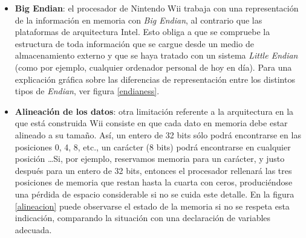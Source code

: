 \begin{itemize}
\item \textbf{Big Endian}: el procesador de Nintendo Wii trabaja con una representación de la información en memoria con \emph{Big Endian}, al contrario que las plataformas de arquitectura Intel. Esto obliga a que se compruebe la estructura de toda información que se cargue desde un medio de almacenamiento externo y que se haya tratado con un sistema \emph{Little Endian} (como por ejemplo, cualquier ordenador personal de hoy en día). Para una explicación gráfica sobre las diferencias de representación entre los distintos tipos de \emph{Endian}, ver figura \ref{endianess}.


\item \textbf{Alineación de los datos}: otra limitación referente a la arquitectura en la que está construida Wii consiste en que cada dato en memoria debe estar alineado a su tamaño. Así, un entero de 32 bits sólo podrá encontrarse en las posiciones 0, 4, 8, etc., un carácter (8 bits) podrá encontrarse en cualquier posición \ldots Si, por ejemplo, reservamos memoria para un carácter, y justo después para un entero de 32 bits, entonces el procesador rellenará las tres posiciones de memoria que restan hasta la cuarta con ceros, produciéndose una pérdida de espacio considerable si no se cuida este detalle. En la figura \ref{alineacion} puede observarse el estado de la memoria si no se respeta esta indicación, comparando la situación con una declaración de variables adecuada.



\end{itemize}
